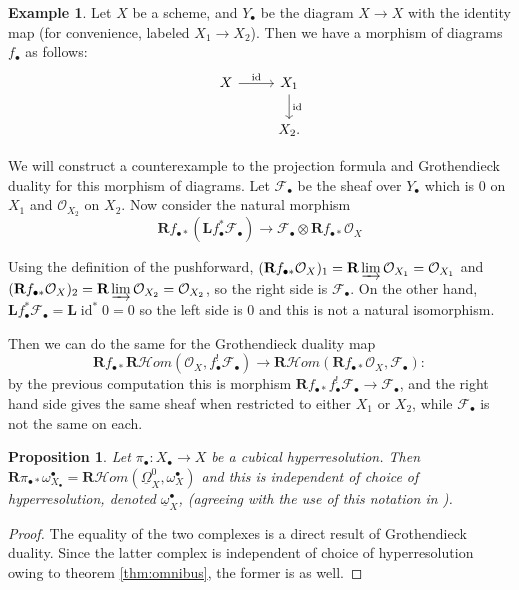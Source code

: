\documentclass[proquest]{uwthesis}[2014/11/13]
\newtheorem{prop}[theorem]{Proposition}
\theoremstyle{definition}
\newtheorem{example}[theorem]{Example}
\newcommand{\cHom}{\mathcal{H} \textit{om}}
\DeclareMathOperator{\id}{id}
\newcommand{\FF}{\mathscr{F}}
\newcommand{\bL}{\textbf{L}}
\newcommand{\OO}{\mathcal{O}}
\newcommand{\bR}{\textbf{R}}
\newcommand{\DB}{\underline{\Omega}}
\newcommand{\db}{\underline{\omega}^\bullet}
\begin{document}
\begin{example}
	Let $X$ be a scheme, and $Y_\bullet$ be the diagram $X \rightarrow X$ with the identity map (for convenience, labeled $X_1 \rightarrow X_2$).
	Then we have a morphism of diagrams $f_\bullet$ as follows:
	\[
	\begin{tikzcd}
		X \arrow{r}{\id} & X_1 \arrow{d}{\id} \\
		& X_2.
	\end{tikzcd}
	\]
	
	We will construct a counterexample to the projection formula and Grothendieck duality for this morphism of diagrams.
	Let $\FF_\bullet$ be the sheaf over $Y_\bullet$ which is 0 on $X_1$ and $\OO_{X_2}$ on $X_2$.
	Now consider the natural morphism
	\[
		\bR f_{\bullet *} (\bL f_\bullet^* \FF_\bullet) \rightarrow \FF_\bullet \otimes \bR f_{\bullet *} \OO_X
	\]
	
	Using the definition of the pushforward, $(\bR f_{\bullet *} \OO_X)_1 = \bR \varinjlim \OO_{X_1} = \OO_{X_1}$ and $(\bR f_{\bullet *} \OO_X)_2 = \bR \varinjlim \OO_{X_2} = \OO_{X_2}$, so the right side is $\FF_\bullet$.
	On the other hand, $\bL f_\bullet^* \FF_\bullet = \bL \id^* 0 = 0$ so the left side is 0 and this is not a natural isomorphism.
	
	Then we can do the same for the Grothendieck duality map
	\[
		\bR f_{\bullet *} \bR \cHom(\OO_X, f_\bullet^! \FF_\bullet) \rightarrow \bR \cHom(\bR f_{\bullet *} \OO_X , \FF_\bullet):
	\]
	by the previous computation this is morphism $\bR f_{\bullet *} f_\bullet^! \FF_\bullet \rightarrow \FF_\bullet$, and the right hand side gives the same sheaf when restricted to either $X_1$ or $X_2$, while $\FF_\bullet$ is not the same on each.
\end{example}

\begin{prop}
	Let $\pi_\bullet : X_\bullet \rightarrow X$ be a cubical hyperresolution.
	Then $\bR \pi_{\bullet *} \omega_{X_\bullet}^\bullet = \bR \cHom(\DB_X^0,\omega_X^\bullet)$ and this is independent of choice of hyperresolution, denoted $\db_X$, (agreeing with the use of this notation in \cite{Kovacs2011a}).
\end{prop}
\begin{proof}
	The equality of the two complexes is a direct result of Grothendieck duality.
	Since the latter complex is independent of choice of hyperresolution owing to theorem \ref{thm:omnibus}, the former is as well.
\end{proof}
\end{document}
